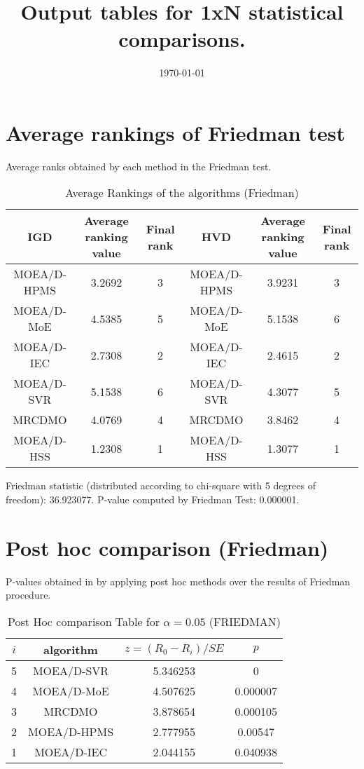\documentclass[a4paper,10pt]{article}
\title{Output tables for 1xN statistical comparisons.}
\author{}
\date{\today}
\begin{document}
\begin{landscape}
\pagestyle{empty}
\maketitle
\thispagestyle{empty}

\section{Average rankings of Friedman test}


Average ranks obtained by each method in the Friedman test.

\begin{table}[!htp]
\centering
\begin{tabular}{|c|c|c|c|c|c|}\hline
IGD&Average ranking value&Final rank&HVD&Average ranking value&Final rank\\
\hline
MOEA/D-HPMS&3.2692&3&MOEA/D-HPMS&3.9231&3\\
MOEA/D-MoE&4.5385&5 &MOEA/D-MoE&5.1538&6\\
MOEA/D-IEC&2.7308&2 & MOEA/D-IEC&2.4615&2\\
MOEA/D-SVR&5.1538&6 & MOEA/D-SVR&4.3077&5\\
MRCDMO&4.0769&4     & MRCDMO&3.8462&4\\
MOEA/D-HSS&1.2308&1 & MOEA/D-HSS&1.3077&1\\
\hline\end{tabular}
\caption{Average Rankings of the algorithms (Friedman)}
\end{table}

Friedman statistic (distributed according to chi-square with 5 degrees of freedom): 36.923077. \newline P-value computed by Friedman Test: 0.000001.\newline


\newpage

\section{Post hoc comparison (Friedman)}


P-values obtained in by applying post hoc methods over the results of Friedman procedure.

\begin{table}[!htp]
\centering\footnotesize
\begin{tabular}{cccc}
$i$&algorithm&$z=(R_0 - R_i)/SE$&$p$\\
\hline5& MOEA/D-SVR&5.346253&0\\4& MOEA/D-MoE&4.507625&0.000007\\3& MRCDMO&3.878654&0.000105\\2&MOEA/D-HPMS&2.777955&0.00547\\1& MOEA/D-IEC&2.044155&0.040938\\\hline
\end{tabular}
\caption{Post Hoc comparison Table for $\alpha=0.05$ (FRIEDMAN)}
\end{table}
\newpage


\end{landscape}
\end{document}
